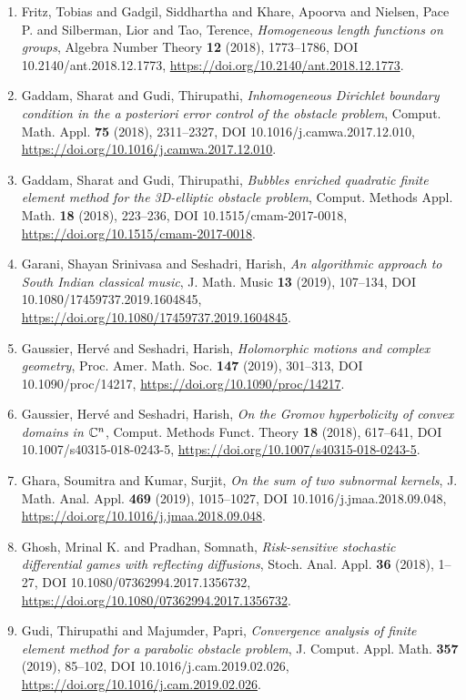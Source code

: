 \begin{enumerate}
\item Fritz, Tobias and Gadgil, Siddhartha and Khare, Apoorva and Nielsen, Pace P. and Silberman, Lior and Tao, Terence, {\em Homogeneous length functions on groups}, Algebra Number Theory {\bf 12} (2018), 1773--1786, DOI 10.2140/ant.2018.12.1773, \url{https://doi.org/10.2140/ant.2018.12.1773}.
\item Gaddam, Sharat and Gudi, Thirupathi, {\em Inhomogeneous {D}irichlet boundary condition in the {\it a
posteriori} error control of the obstacle problem}, Comput. Math. Appl. {\bf 75} (2018), 2311--2327, DOI 10.1016/j.camwa.2017.12.010, \url{https://doi.org/10.1016/j.camwa.2017.12.010}.
\item Gaddam, Sharat and Gudi, Thirupathi, {\em Bubbles enriched quadratic finite element method for the
3{D}-elliptic obstacle problem}, Comput. Methods Appl. Math. {\bf 18} (2018), 223--236, DOI 10.1515/cmam-2017-0018, \url{https://doi.org/10.1515/cmam-2017-0018}.
\item Garani, Shayan Srinivasa and Seshadri, Harish, {\em An algorithmic approach to {S}outh {I}ndian classical music}, J. Math. Music {\bf 13} (2019), 107--134, DOI 10.1080/17459737.2019.1604845, \url{https://doi.org/10.1080/17459737.2019.1604845}.
\item Gaussier, Herv\'{e} and Seshadri, Harish, {\em Holomorphic motions and complex geometry}, Proc. Amer. Math. Soc. {\bf 147} (2019), 301--313, DOI 10.1090/proc/14217, \url{https://doi.org/10.1090/proc/14217}.
\item Gaussier, Herv\'{e} and Seshadri, Harish, {\em On the {G}romov hyperbolicity of convex domains in {$\Bbb
C^n$}}, Comput. Methods Funct. Theory {\bf 18} (2018), 617--641, DOI 10.1007/s40315-018-0243-5, \url{https://doi.org/10.1007/s40315-018-0243-5}.
\item Ghara, Soumitra and Kumar, Surjit, {\em On the sum of two subnormal kernels}, J. Math. Anal. Appl. {\bf 469} (2019), 1015--1027, DOI 10.1016/j.jmaa.2018.09.048, \url{https://doi.org/10.1016/j.jmaa.2018.09.048}.
\item Ghosh, Mrinal K. and Pradhan, Somnath, {\em Risk-sensitive stochastic differential games with reflecting
diffusions}, Stoch. Anal. Appl. {\bf 36} (2018), 1--27, DOI 10.1080/07362994.2017.1356732, \url{https://doi.org/10.1080/07362994.2017.1356732}.
\item Gudi, Thirupathi and Majumder, Papri, {\em Convergence analysis of finite element method for a parabolic
obstacle problem}, J. Comput. Appl. Math. {\bf 357} (2019), 85--102, DOI 10.1016/j.cam.2019.02.026, \url{https://doi.org/10.1016/j.cam.2019.02.026}.

\end{enumerate}
